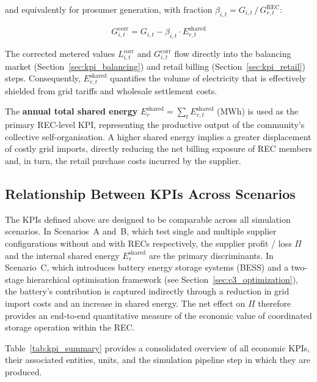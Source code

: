 and equivalently for prosumer generation, with fraction $\beta_{i,t} = G_{i,t}\, /\, G^{\mathrm{REC}}_{r,t}$:

\begin{equation}
    G^{\mathrm{corr}}_{i,t} = G_{i,t} - \beta_{i,t} \cdot E^{\mathrm{shared}}_{r,t}
    \label{eq:corrected_gen}
\end{equation}

The corrected metered values $L^{\mathrm{corr}}_{i,t}$ and $G^{\mathrm{corr}}_{i,t}$ flow directly into the balancing market (Section~\ref{sec:kpi_balancing}) and retail billing (Section~\ref{sec:kpi_retail}) steps. Consequently, $E^{\mathrm{shared}}_{r,t}$ quantifies the volume of electricity that is effectively shielded from grid tariffs and wholesale settlement costs.

The \textbf{annual total shared energy} $E^{\mathrm{shared}}_r = \sum_t E^{\mathrm{shared}}_{r,t}$ (MWh) is used as the primary REC-level KPI, representing the productive output of the community's collective self-organisation. A higher shared energy implies a greater displacement of costly grid imports, directly reducing the net billing exposure of REC members and, in turn, the retail purchase costs incurred by the supplier.

\subsection{Relationship Between KPIs Across Scenarios}
\label{sec:kpi_relationships}

The KPIs defined above are designed to be comparable across all simulation scenarios. In Scenarios~A and~B, which test single and multiple supplier configurations without and with RECs respectively, the supplier profit / loss $\Pi$ and the internal shared energy $E^{\mathrm{shared}}_r$ are the primary discriminants. In Scenario~C, which introduces battery energy storage systems (BESS) and a two-stage hierarchical optimisation framework (see Section~\ref{sec:c3_optimization}), the battery's contribution is captured indirectly through a reduction in grid import costs and an increase in shared energy. The net effect on $\Pi$ therefore provides an end-to-end quantitative measure of the economic value of coordinated storage operation within the REC.

Table~\ref{tab:kpi_summary} provides a consolidated overview of all economic KPIs, their associated entities, units, and the simulation pipeline step in which they are produced.

